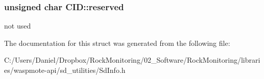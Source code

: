 \subsubsection[{\texorpdfstring{reserved}{reserved}}]{\setlength{\rightskip}{0pt plus 5cm}unsigned char C\+I\+D\+::reserved}\hypertarget{struct_c_i_d_a7d489455802a3a9728a5cec60927a7c7}{}\label{struct_c_i_d_a7d489455802a3a9728a5cec60927a7c7}
not used 

The documentation for this struct was generated from the following file\+:\begin{DoxyCompactItemize}
\item 
C\+:/\+Users/\+Daniel/\+Dropbox/\+Rock\+Monitoring/02\+\_\+\+Software/\+Rock\+Monitoring/libraries/waspmote-\/api/sd\+\_\+utilities/Sd\+Info.\+h\end{DoxyCompactItemize}

